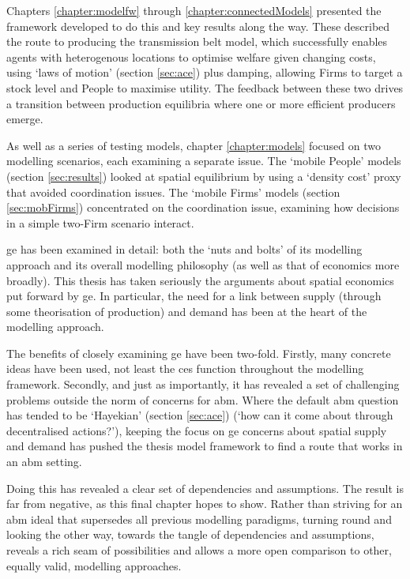 Chapters \ref{chapter:modelfw} through \ref{chapter:connectedModels} presented the framework developed to do this and key results along the way. These described the route to producing the transmission belt model, which successfully enables agents with heterogenous locations to optimise welfare given changing costs, using `laws of motion' (section \ref{sec:ace}) plus damping, allowing Firms to target a stock level and People to maximise utility. The feedback between these two drives a transition between production equilibria where one or more efficient producers emerge.

As well as a series of testing models, chapter \ref{chapter:models} focused on two modelling scenarios, each examining a separate issue. The `mobile People' models (section \ref{sec:results}) looked at spatial equilibrium by using a `density cost' proxy that avoided coordination issues. The `mobile Firms' models (section \ref{sec:mobFirms}) concentrated on the coordination issue, examining how decisions in a simple two-Firm scenario interact. 

\gls{ge} has been examined in detail: both the `nuts and bolts' of its modelling approach and its overall modelling philosophy (as well as that of economics more broadly). This thesis has taken seriously the arguments about spatial economics put forward by \gls{ge}. In particular, the need for a link between supply (through some theorisation of production) and demand has been at the heart of the modelling approach. 

The benefits of closely examining \gls{ge} have been two-fold. Firstly, many concrete ideas have been used, not least the \gls{ces} function throughout the modelling framework. Secondly, and just as importantly, it has revealed a set of challenging problems outside the norm of concerns for \gls{abm}. Where the default \gls{abm} question has tended to be `Hayekian' (section \ref{sec:ace}) (`how can it come about through decentralised actions?'), keeping the focus on \gls{ge} concerns about spatial supply and demand has pushed the thesis model framework to find a route that works in an \gls{abm} setting.

Doing this has revealed a clear set of dependencies and assumptions. The result is far from negative, as this final chapter hopes to show. Rather than striving for an \gls{abm} ideal that supersedes all previous modelling paradigms, turning round and looking the other way, towards the tangle of dependencies and assumptions, reveals a rich seam of possibilities and allows a more open comparison to other, equally valid, modelling approaches.

